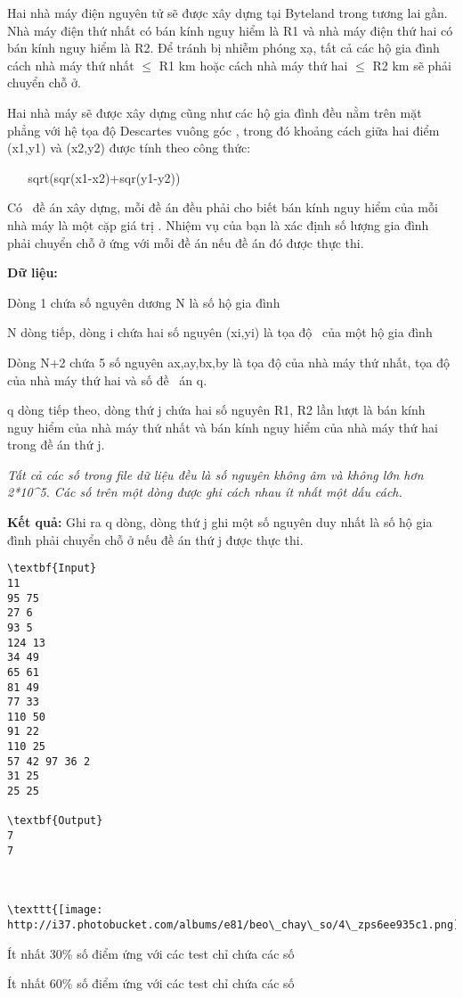 

Hai nhà máy điện nguyên tử sẽ được xây dựng tại Byteland trong tương lai gần. Nhà máy điện thứ nhất có bán kính nguy hiểm là R1 và nhà máy điện thứ hai có bán kính nguy hiểm là R2. Để tránh bị nhiễm phóng xạ, tất cả các hộ gia đình cách nhà máy thứ nhất  $\le$ R1 km hoặc cách nhà máy thứ hai  $\le$ R2 km sẽ phải chuyển chỗ ở.

Hai nhà máy sẽ được xây dựng cũng như các hộ gia đình đều nằm trên mặt phẳng với hệ tọa độ Descartes vuông góc , trong đó khoảng cách giữa hai điểm (x1,y1) và (x2,y2) được tính theo công thức:

    sqrt(sqr(x1-x2)+sqr(y1-y2))

Có  đề án xây dựng, mỗi đề án đều phải cho biết bán kính nguy hiểm của mỗi nhà máy là một cặp giá trị . Nhiệm vụ của bạn là xác định số lượng gia đình phải chuyển chỗ ở ứng với mỗi đề án nếu đề án đó được thực thi.

\textbf{Dữ liệu:} 

Dòng 1 chứa số nguyên dương N là số hộ gia đình

N dòng tiếp, dòng i chứa hai số nguyên (xi,yi) là tọa độ  của một hộ gia đình

Dòng N+2 chứa 5 số nguyên ax,ay,bx,by là tọa độ của nhà máy thứ nhất, tọa độ của nhà máy thứ hai và số đề  án q.

q dòng tiếp theo, dòng thứ j chứa hai số nguyên R1, R2 lần lượt là bán kính nguy hiểm của nhà máy thứ nhất và bán kính nguy hiểm của nhà máy thứ hai trong đề án thứ j.

\emph{Tất cả các số trong file dữ liệu đều là số nguyên không âm và không lớn hơn 2*10^5}\emph{. Các số trên một dòng được ghi cách nhau ít nhất một dấu cách.}

\textbf{Kết quả: }Ghi ra q dòng, dòng thứ j ghi một số nguyên duy nhất là số hộ gia đình phải chuyển chỗ ở nếu đề án thứ j được thực thi.
\begin{verbatim}
\textbf{Input}
11
95 75
27 6
93 5
124 13
34 49
65 61
81 49
77 33
110 50
91 22
110 25
57 42 97 36 2
31 25
25 25

\textbf{Output}
7
7



\texttt{[image: http://i37.photobucket.com/albums/e81/beo\_chay\_so/4\_zps6ee935c1.png]}\end{verbatim}

Ít nhất 30\% số điểm ứng với các test chỉ chứa các số

Ít nhất 60\% số điểm ứng với các test chỉ chứa các số 

